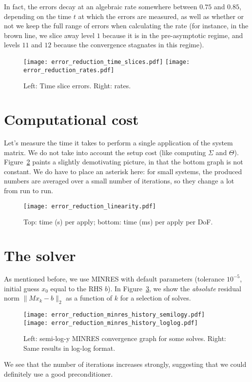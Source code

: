 \documentclass[11pt,a4paper]{amsart}
\theoremstyle{definition}
\begin{document}
In fact, the errors decay at an algebraic rate somewhere between $0.75$ and $0.85$,
depending on the time $t$ at which the errors are measured, as well as whether or
not we keep the full range of errors when calculating the rate (for instance, in
the brown line, we slice away level $1$ because it is in the pre-asymptotic regime,
and levels $11$ and $12$ because the convergence stagnates in this regime).
\begin{figure}[h!]
  \texttt{[image: error\_reduction\_time\_slices.pdf]}
  \texttt{[image: error\_reduction\_rates.pdf]}
  \caption{Left: Time slice errors. Right: rates.}
  \label{fig:time-slice}
\end{figure}

\section*{Computational cost}
Let's measure the time it takes to perform a single application of the system
matrix. We do not take into account the setup cost (like
computing $\Sigma$ and $\Theta$). Figure~\ref{fig:linearity} paints a slightly
demotivating picture, in that the bottom graph is not constant. We do have to
place an asterisk here: for small systems, the produced numbers are averaged over
a small number of iterations, so they change a lot from run to run.
\begin{figure}[h!]
  \texttt{[image: error\_reduction\_linearity.pdf]}
  \caption{Top: time (s) per apply; bottom: time (ms) per apply per DoF.}
  \label{fig:linearity}
\end{figure}

\section*{The solver}
As mentioned before, we use MINRES with default parameters (tolerance $10^{-5}$,
initial guess $x_0$ equal to the RHS $b$). In Figure~\ref{fig:minres}, we show
the \emph{absolute} residual norm $\|M x_k - b\|_2$ as a function of $k$ for a
selection of solves.
\begin{figure}[h!]
  \texttt{[image: error\_reduction\_minres\_history\_semilogy.pdf]}
  \texttt{[image: error\_reduction\_minres\_history\_loglog.pdf]}
  \caption{Left: semi-log-y MINRES convergence graph for some solves. Right: Same results in log-log format.}
  \label{fig:minres}
\end{figure}
We see that the number of iterations increases strongly, suggesting that we could
definitely use a good preconditioner.
\end{document}
